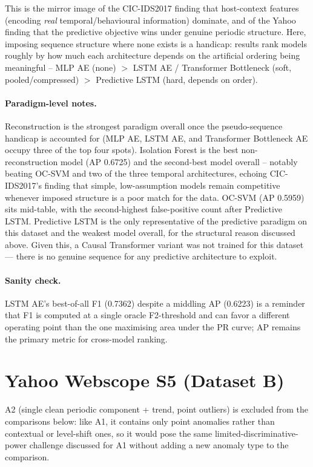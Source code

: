 This is the mirror image of the CIC-IDS2017 finding that host-context features (encoding \emph{real} temporal/behavioural information) dominate, and of the Yahoo finding that the predictive objective wins under genuine periodic structure. Here, imposing sequence structure where none exists is a handicap: results rank models roughly by how much each architecture depends on the artificial ordering being meaningful -- MLP AE (none) $>$ LSTM AE / Transformer Bottleneck (soft, pooled/compressed) $>$ Predictive LSTM (hard, depends on order).

\paragraph{Paradigm-level notes.} Reconstruction is the strongest paradigm overall once the pseudo-sequence handicap is accounted for (MLP AE, LSTM AE, and Transformer Bottleneck AE occupy three of the top four spots). Isolation Forest is the best non-reconstruction model (AP 0.6725) and the second-best model overall -- notably beating OC-SVM and two of the three temporal architectures, echoing CIC-IDS2017's finding that simple, low-assumption models remain competitive whenever imposed structure is a poor match for the data. OC-SVM (AP 0.5959) sits mid-table, with the second-highest false-positive count after Predictive LSTM. Predictive LSTM is the only representative of the predictive paradigm on this dataset and the weakest model overall, for the structural reason discussed above. Given this, a Causal Transformer variant was not trained for this dataset — there is no genuine sequence for any predictive architecture to exploit.

\paragraph{Sanity check.} LSTM AE's best-of-all F1 (0.7362) despite a middling AP (0.6223) is a reminder that F1 is computed at a single oracle F2-threshold and can favor a different operating point than the one maximising area under the PR curve; AP remains the primary metric for cross-model ranking.

\section{Yahoo Webscope S5 (Dataset B)}

A2 (single clean periodic component + trend, point outliers) is excluded from the comparisons below: like A1, it contains only point anomalies rather than contextual or level-shift ones, so it would pose the same limited-discriminative-power challenge discussed for A1 without adding a new anomaly type to the comparison.

